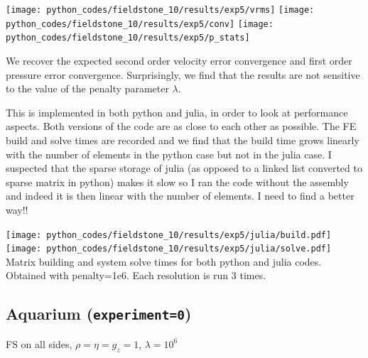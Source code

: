 \begin{center}
\texttt{[image: python\_codes/fieldstone\_10/results/exp5/vrms]}
\texttt{[image: python\_codes/fieldstone\_10/results/exp5/conv]}
\texttt{[image: python\_codes/fieldstone\_10/results/exp5/p\_stats]}
\end{center}
We recover the expected second order velocity error convergence 
and first order pressure error convergence. 
Surprisingly, we find that the results are not sensitive to the value of the penalty parameter $\lambda$.

This \stone is implemented in both python and julia, in order to look at
performance aspects. Both versions of the code are as close to each other 
as possible. The FE build and solve times are recorded and we find
that the build time grows linearly with the number of elements in the python 
case but not in the julia case. I suspected that the sparse storage of julia
(as opposed to a linked list converted to sparse matrix in python) makes it slow
so I ran the code without the assembly and indeed it is then linear with the 
number of elements.
I need to find a better way!!

\begin{center}
\texttt{[image: python\_codes/fieldstone\_10/results/exp5/julia/build.pdf]}
\texttt{[image: python\_codes/fieldstone\_10/results/exp5/julia/solve.pdf]}\\
{\captionfont Matrix building and system solve times for both python and julia codes.
Obtained with penalty=1e6. Each resolution is run 3 times.}
\end{center}


\subsection*{Aquarium ({\tt experiment=0})}

FS on all sides, $\rho=\eta=g_z=1$, $\lambda=10^6$

